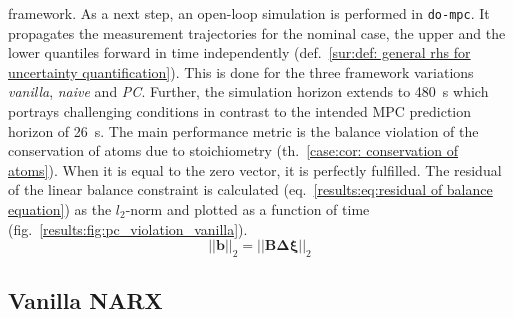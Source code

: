 framework.
\newline
\newline
\noindent
As a next step, an open-loop simulation is performed in \texttt{do-mpc}.
It propagates the measurement trajectories for the nominal case, the upper and the lower quantiles forward
in time independently (def.~\ref{sur:def: general rhs for uncertainty quantification}). This is done for 
the three framework variations \emph{vanilla}, \emph{naive} and \emph{PC}. Further, the simulation
horizon extends to \SI{480}{\second} which portrays challenging conditions in contrast to the intended MPC
prediction horizon of \SI{26}{\second}. The main 
performance metric is the balance violation of the conservation of atoms due to stoichiometry (th.~\ref{case:cor: conservation of atoms}).
When it is equal to the zero vector, it is perfectly fulfilled.
The residual of the linear balance constraint is calculated (eq.~\ref{results:eq:residual of balance equation})
as the $l_2$-norm
and plotted as a function of time (fig.~\ref{results:fig:pc_violation_vanilla}).
\begin{equation}
    \label{results:eq:residual of balance equation}
    ||\bm{b}||_2 = ||\bm{B} \bm{\Delta \xi}||_2
\end{equation}

\subsection{Vanilla NARX}

